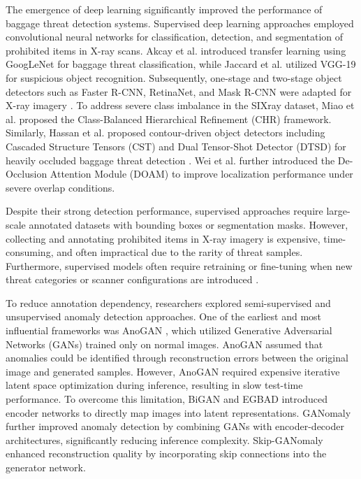 \documentclass{bmvc2k}
\begin{document}
The emergence of deep learning significantly improved the performance of baggage threat detection systems. Supervised deep learning approaches employed convolutional neural networks for classification, detection, and segmentation of prohibited items in X-ray scans. Akcay et al. \cite{akcay2016} introduced transfer learning using GoogLeNet for baggage threat classification, while Jaccard et al. \cite{jaccard2017} utilized VGG-19 for suspicious object recognition. Subsequently, one-stage and two-stage object detectors such as Faster R-CNN, RetinaNet, and Mask R-CNN were adapted for X-ray imagery \cite{liu2018,gaus2019a,gaus2019b}. To address severe class imbalance in the SIXray dataset, Miao et al. \cite{miao2019sixray} proposed the Class-Balanced Hierarchical Refinement (CHR) framework. Similarly, Hassan et al. proposed contour-driven object detectors including Cascaded Structure Tensors (CST) and Dual Tensor-Shot Detector (DTSD) for heavily occluded baggage threat detection \cite{hassan2020cst,hassan2020dtsd}. Wei et al. \cite{wei2020doam} further introduced the De-Occlusion Attention Module (DOAM) to improve localization performance under severe overlap conditions.

Despite their strong detection performance, supervised approaches require large-scale annotated datasets with bounding boxes or segmentation masks. However, collecting and annotating prohibited items in X-ray imagery is expensive, time-consuming, and often impractical due to the rarity of threat samples. Furthermore, supervised models often require retraining or fine-tuning when new threat categories or scanner configurations are introduced \cite{gaus2019a}.

To reduce annotation dependency, researchers explored semi-supervised and unsupervised anomaly detection approaches. One of the earliest and most influential frameworks was AnoGAN \cite{schlegl2017anogan}, which utilized Generative Adversarial Networks (GANs) trained only on normal images. AnoGAN assumed that anomalies could be identified through reconstruction errors between the original image and generated samples. However, AnoGAN required expensive iterative latent space optimization during inference, resulting in slow test-time performance. To overcome this limitation, BiGAN \cite{donahue2016bigan} and EGBAD \cite{zenati2018egbad} introduced encoder networks to directly map images into latent representations. GANomaly \cite{akcay2018ganomaly} further improved anomaly detection by combining GANs with encoder-decoder architectures, significantly reducing inference complexity. Skip-GANomaly \cite{akcay2019skip} enhanced reconstruction quality by incorporating skip connections into the generator network.
\end{document}
